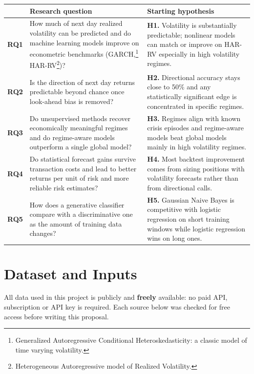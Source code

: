 \documentclass[11pt,a4paper]{article}
\begin{document}
{\small
\begin{xltabular}{\linewidth}{>{\bfseries\color{navy}}l Y Y}
\toprule
 & \textbf{Research question} & \textbf{Starting hypothesis} \\
\midrule
\endhead
RQ1 & How much of next day realized volatility can be predicted and do machine learning models improve on econometric benchmarks (GARCH,\footnote{Generalized Autoregressive Conditional Heteroskedasticity: a classic model of time varying volatility.} HAR-RV\footnote{Heterogeneous Autoregressive model of Realized Volatility.})?
    & \textbf{H1.} Volatility is substantially predictable; nonlinear models can match or improve on HAR-RV especially in high volatility regimes. \\
RQ2 & Is the direction of next day returns predictable beyond chance once look-ahead bias is removed?
    & \textbf{H2.} Directional accuracy stays close to 50\% and any statistically significant edge is
      concentrated in specific regimes. \\
RQ3 & Do unsupervised methods recover economically meaningful regimes and do regime-aware models outperform
      a single global model?
    & \textbf{H3.} Regimes align with known crisis episodes and regime-aware models beat global models
      mainly in high volatility regimes. \\
RQ4 & Do statistical forecast gains survive transaction costs and lead to better returns per unit of risk and more reliable risk estimates?
    & \textbf{H4.} Most backtest improvement comes from sizing positions with volatility forecasts rather than from directional calls. \\
RQ5 & How does a generative classifier compare with a discriminative one as the amount of training data changes?
    & \textbf{H5.} Gaussian Naive Bayes is competitive with logistic regression on short training windows while logistic regression wins on long ones. \\
\bottomrule
\end{xltabular}}

\section*{Dataset and Inputs}
All data used in this project is publicly and \textbf{freely} available: no paid API, subscription or API key
is required. Each source below was checked for free access before writing this proposal.
\end{document}
